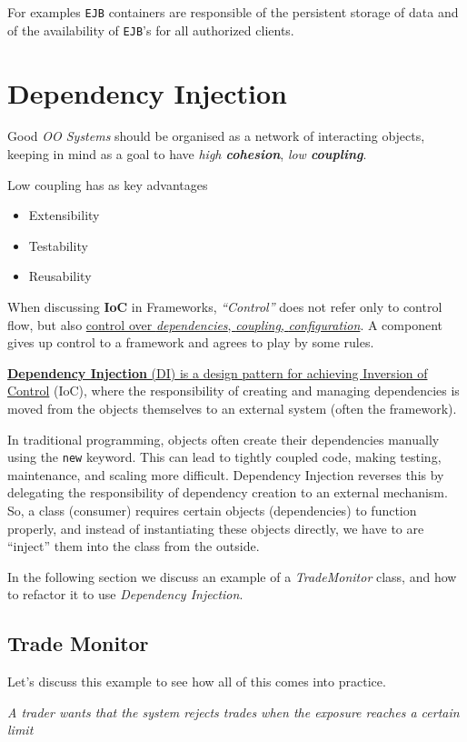 For examples \texttt{EJB} containers are responsible of the
persistent storage of data and of the availability of
\texttt{EJB}’s for all authorized clients.

\section{Dependency Injection}
Good \textit{OO Systems} should be organised as
a network of interacting objects,
keeping in mind as a goal to have \textit{high \textbf{cohesion}}, \textit{low \textbf{coupling}}.\\
{Low coupling has as key advantages\ns
\begin{itemize}
   \item Extensibility
   \item Testability
   \item Reusability
\end{itemize}}

When discussing \textbf{IoC} in Frameworks, \textit{``Control''} does not refer only to control flow, but also \ul{control over \textit{dependencies}, \textit{coupling}, \textit{configuration}}.
A component gives up control to a framework and agrees to play by some rules.

\ul{\textbf{Dependency Injection} (DI) is a design pattern for achieving Inversion of Control} (IoC), where the responsibility of creating and managing dependencies is moved from the objects themselves to an external system (often the framework).


In traditional programming, objects often create their dependencies manually using the \lstinline|new| keyword. This can lead to tightly coupled code, making testing, maintenance, and scaling more difficult. Dependency Injection reverses this by delegating the responsibility of dependency creation to an external mechanism.\\
So, a class (consumer) requires certain objects (dependencies) to function properly, and instead of instantiating these objects directly, we have to are ``inject'' them into the class from the outside.

In the following section we discuss an example of a \textit{TradeMonitor} class, and how to refactor it to use \textit{Dependency Injection}.

\subsection{Trade Monitor}
Let's discuss this example to see how all of this comes into practice.
\begin{center}
   \textit{A trader wants that the system rejects trades when the exposure reaches a certain limit}
\end{center}

